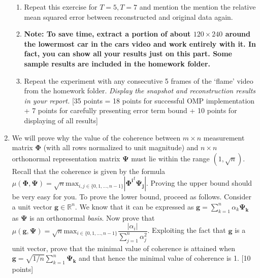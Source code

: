 \documentclass[11pt]{article}
\begin{document}
\begin{enumerate}
\begin{enumerate}
\item Repeat this exercise for $T = 5, T = 7$ and mention the mention the relative mean squared error between reconstructed and original data again.
\item \textbf{Note: To save time, extract a portion of about $120 \times 240$ around the lowermost car in the cars video and work entirely with it. In fact, you can show all your results just on this part. Some sample results are included in the homework folder.}
\item Repeat the experiment with any consecutive 5 frames of the `flame' video from the homework folder. \textit{Display the snapshot and reconstruction results in your report.}
\textsf{[35 points = 18 points for successful OMP implementation + 7 points for carefully presenting error term bound + 10 points for displaying of all results]}
\end{enumerate}

\item We will prove why the value of the coherence between $m \times n$ measurement matrix $\boldsymbol{\Phi}$ (with all rows normalized to unit magnitude) and $n \times n$ orthonormal representation matrix $\boldsymbol{\Psi}$ must lie within the range $(1,\sqrt{n})$. Recall that the coherence is given by the formula
$\mu(\boldsymbol{\Phi},\boldsymbol{\Psi}) = \sqrt{n} \textrm{max}_{i,j \in \{0,1,...,n-1\}} |\boldsymbol{\Phi^i}^t \boldsymbol{\Psi_j}|$. 
Proving the upper bound should be very easy for you. To prove the lower bound, proceed as follows. Consider a unit vector $\boldsymbol{g} \in \mathbb{R}^n$. We know that it can be expressed as $\boldsymbol{g} = \sum_{k=1}^n \alpha_k \boldsymbol{\Psi_k}$ as $\boldsymbol{\Psi}$ is an orthonormal \emph{basis}. Now prove that $\mu(\boldsymbol{g},\boldsymbol{\Psi}) = \sqrt{n} \textrm{max}_{i \in \{0,1,...,n-1\}} \dfrac{|\alpha_i|}{\sum_{j=1}^n \alpha^2_j}$. Exploiting the fact that $\boldsymbol{g}$ is a unit vector, prove that the minimal value of coherence is attained when $\boldsymbol{g} = \sqrt{1/n} \sum_{k=1}^n \boldsymbol{\Psi_k}$ and that hence the minimal value of coherence is 1. \textsf{[10 points]}


\end{enumerate}
\end{document}

